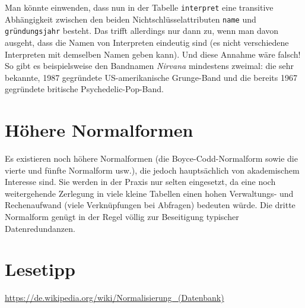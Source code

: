 Man könnte einwenden, dass nun in der Tabelle \lstinline|interpret| eine 
transitive Abhängigkeit zwischen den beiden Nichtschlüsselattributen
\lstinline|name| und \lstinline|gründungsjahr| besteht. Das trifft allerdings 
nur dann zu, wenn man davon ausgeht, dass die Namen von Interpreten
eindeutig sind (es nicht verschiedene Interpreten mit demselben Namen geben 
kann). Und diese Annahme wäre falsch! So gibt es beispielsweise den Bandnamen 
\emph{Nirvana} mindestens zweimal: die sehr bekannte, 1987 gegründete 
US-amerikanische Grunge-Band und die bereits 1967 gegründete britische
Psychedelic-Pop-Band.


\section{Höhere Normalformen}

Es existieren noch höhere Normalformen (die Boyce-Codd-Normalform sowie die 
vierte und fünfte Normalform usw.), die jedoch hauptsächlich von akademischem 
Interesse sind. Sie werden in der Praxis nur selten eingesetzt, da eine noch 
weitergehende Zerlegung in viele kleine Tabellen einen hohen Verwaltungs- und 
Rechenaufwand (viele Verknüpfungen bei Abfragen) bedeuten würde. Die dritte 
Normalform genügt in der Regel völlig zur Beseitigung typischer 
Datenredundanzen.


\section{Lesetipp}

\url{https://de.wikipedia.org/wiki/Normalisierung\_(Datenbank)}
